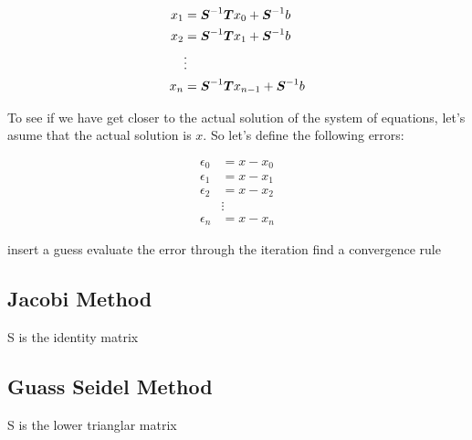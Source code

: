 \begin{align*}
	x_1 &= \boldsymbol{S}^{-1} \boldsymbol{T} x_0 + \boldsymbol{S}^{-1} b \\
	x_2 &= \boldsymbol{S}^{-1} \boldsymbol{T} x_1 + \boldsymbol{S}^{-1} b \\
	& \vdots \\
	x_n &= \boldsymbol{S}^{-1} \boldsymbol{T} x_{n-1} + \boldsymbol{S}^{-1} b
\end{align*}


To see if we have get closer to the actual solution of the system of equations, let's asume that the actual solution is $x$. So let's define the following errors:

\begin{align*}
	\epsilon_0 &= x - x_0 \\
	\epsilon_1 &= x - x_1 \\
	\epsilon_2 &= x - x_2 \\
	& \vdots \\
	\epsilon_n &= x - x_n 
\end{align*}

insert a guess
evaluate the error through the iteration
find a convergence rule

\subsection{Jacobi Method}

S is the identity matrix

\subsection{Guass Seidel Method}

S is the lower trianglar matrix





